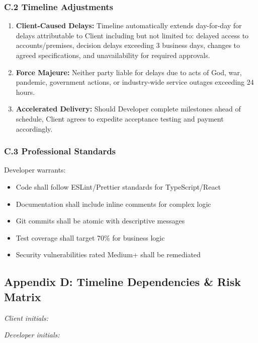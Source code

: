 \documentclass[11pt, a4paper]{article}
\begin{document}
\subsubsection*{C.2 Timeline Adjustments}
\begin{enumerate}[label=\alph*.]
\item \textbf{Client-Caused Delays:} Timeline automatically extends day-for-day for delays attributable to Client including but not limited to: delayed access to accounts/premises, decision delays exceeding 3 business days, changes to agreed specifications, and unavailability for required approvals.
\item \textbf{Force Majeure:} Neither party liable for delays due to acts of God, war, pandemic, government actions, or industry-wide service outages exceeding 24 hours.
\item \textbf{Accelerated Delivery:} Should Developer complete milestones ahead of schedule, Client agrees to expedite acceptance testing and payment accordingly.
\end{enumerate}

\subsubsection*{C.3 Professional Standards}
Developer warrants:
\begin{itemize}[leftmargin=*]
\item Code shall follow ESLint/Prettier standards for TypeScript/React
\item Documentation shall include inline comments for complex logic
\item Git commits shall be atomic with descriptive messages
\item Test coverage shall target 70\% for business logic
\item Security vulnerabilities rated Medium+ shall be remediated
\end{itemize}

\subsection*{Appendix D: Timeline Dependencies \& Risk Matrix}
\label{appendix:timeline}
\noindent
\begin{minipage}[t]{0.45\textwidth}
\textit{Client initials: }\TextField[name=init_client_D,width=1.6cm,bordercolor={0.7 0.7 0.7}]{}
\end{minipage}%
\hfill%
\begin{minipage}[t]{0.45\textwidth}
\raggedleft
\textit{Developer initials: }\TextField[name=init_dev_D,width=1.6cm,bordercolor={0.7 0.7 0.7}]{}
\end{minipage}
\vspace{0.3cm}
\end{document}
